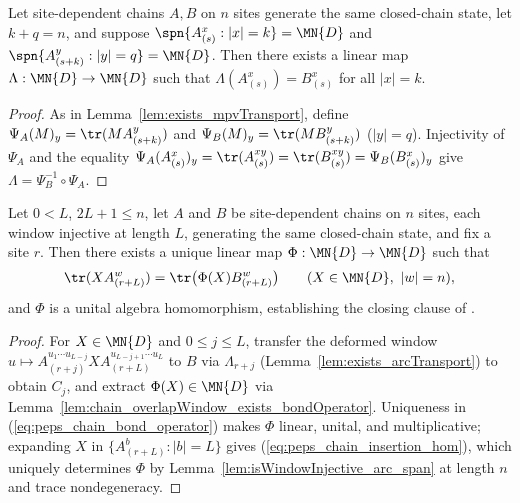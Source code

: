 \begin{lemma}%
    \label{lem:exists_arcTransport}
    \leanok
    Let site-dependent chains $A,B$ on $n$ sites generate the same closed-chain
    state, let $k+q=n$, and suppose $\spn\{A_{(s)}^x:|x|=k\}=\MN{D}$ and
    $\spn\{A_{(s+k)}^y:|y|=q\}=\MN{D}$. Then there exists a linear map
    $\Lambda:\MN{D}\to\MN{D}$ such that $\Lambda(A_{(s)}^x)=B_{(s)}^x$ for all
    $|x|=k$.
\end{lemma}
\begin{proof}\leanok
    As in Lemma~\ref{lem:exists_mpvTransport}, define
    $\Psi_A(M)_y=\tr(M A_{(s+k)}^y)$ and $\Psi_B(M)_y=\tr(M B_{(s+k)}^y)$
    ($|y|=q$). Injectivity of $\Psi_A$ and the equality
    $\Psi_A(A_{(s)}^x)_y=\tr(A_{(s)}^{xy})=\tr(B_{(s)}^{xy})=\Psi_B(B_{(s)}^x)_y$
    give $\Lambda=\Psi_B^{-1}\circ\Psi_A$.
\end{proof}

\begin{lemma}%
    \label{lem:chain_exists_insertionHom}
    \leanok
    Let $0<L$, $2L+1\le n$, let $A$ and $B$ be site-dependent chains on $n$
    sites, each window injective at length $L$, generating the same
    closed-chain state, and fix a site $r$. Then there exists a unique linear
    map $\Phi:\MN{D}\to\MN{D}$ such that
    \begin{align}
        \tr(X A_{(r+L)}^w) = \tr\bigl(\Phi(X) B_{(r+L)}^w\bigr)
        \qquad (X\in\MN{D},\ |w|=n),
        \label{eq:peps_chain_insertion_hom}
    \end{align}
    and $\Phi$ is a unital algebra homomorphism, establishing the closing clause
    of \cite[Lemma~5]{Molnar2018NormalPEPS}.
\end{lemma}
\begin{proof}\leanok
    For $X\in\MN{D}$ and $0\le j\le L$, transfer the deformed window
    $u\mapsto A_{(r+j)}^{u_1\cdots u_{L-j}} X A_{(r+L)}^{u_{L-j+1}\cdots u_L}$
    to $B$ via $\Lambda_{r+j}$ (Lemma~\ref{lem:exists_arcTransport}) to obtain
    $C_j$, and extract $\Phi(X)\in\MN{D}$ via
    Lemma~\ref{lem:chain_overlapWindow_exists_bondOperator}. Uniqueness in
    (\ref{eq:peps_chain_bond_operator}) makes $\Phi$ linear, unital, and
    multiplicative; expanding $X$ in $\{A_{(r+L)}^b:|b|=L\}$ gives
    (\ref{eq:peps_chain_insertion_hom}), which uniquely determines $\Phi$ by
    Lemma~\ref{lem:isWindowInjective_arc_span} at length $n$ and trace
    nondegeneracy.
\end{proof}

